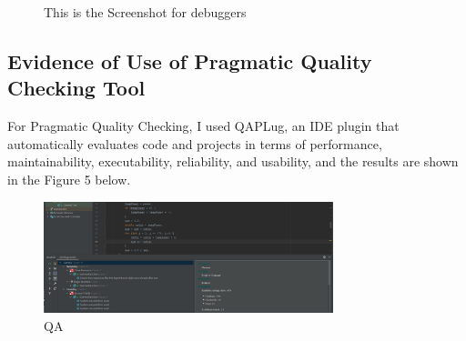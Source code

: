 \documentclass{report}
\begin{document}
\begin{figure}[H]
    \centering
    \quad    
    \caption{This is the Screenshot for debuggers}
\end{figure}

\subsection{Evidence of Use of Pragmatic Quality Checking Tool}
For Pragmatic Quality Checking, I used QAPLug, an IDE plugin that automatically evaluates code and projects in terms of performance, maintainability, executability, reliability, and usability, and the results are shown in the Figure 5 below.
\begin{figure}[htbp]
\centering
\includegraphics[width=0.75\textwidth]{QA_1}
\caption{QA}
\end{figure}
\end{document}
